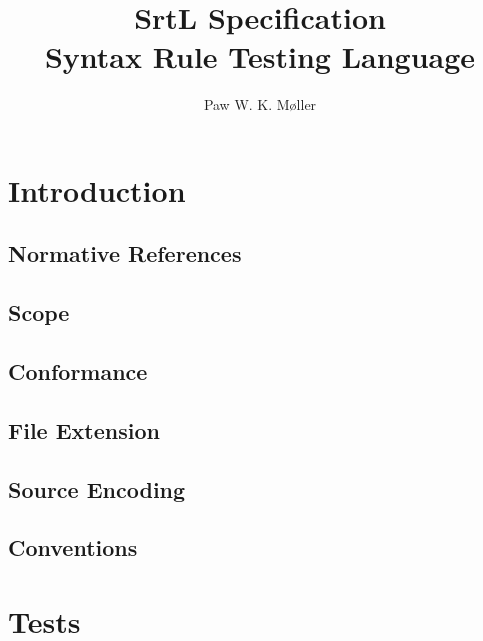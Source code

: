 \documentclass[10pt, a4paper]{article}
\title{SrtL Specification \\ \textbf{S}yntax \textbf{R}ule \textbf{T}esting \textbf{L}anguage}
\author{Paw W. K. Møller}
\begin{document}
    \maketitle
    \clearpage
    
    \tableofcontents
    \clearpage
    
    \setcounter{page}{1}
    \setlength{\parskip}{10pt}

    \maketitle

    \section{Introduction}
    
    
    \subsection{Normative References}
    
    
    \subsection{Scope}
    
    
    \subsection{Conformance}
    
    \clearpage
    
    \subsection{File Extension}
    
    
    \subsection{Source Encoding}
    
    
    \subsection{Conventions}
    
    
    \section{Tests}
    
    
\end{document}
